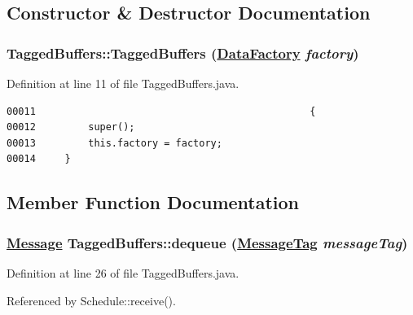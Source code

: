 \subsection{Constructor \& Destructor Documentation}
\hypertarget{classTaggedBuffers_a0}{
\subsubsection[TaggedBuffers]{\setlength{\rightskip}{0pt plus 5cm}Tagged\-Buffers::Tagged\-Buffers (\hyperlink{interfaceDataFactory}{Data\-Factory} {\em factory})}}
\label{classTaggedBuffers_a0}




Definition at line 11 of file Tagged\-Buffers.java.\footnotesize\begin{verbatim}00011                                               {
00012         super();
00013         this.factory = factory;
00014     }
\end{verbatim}\normalsize 


\subsection{Member Function Documentation}
\hypertarget{classTaggedBuffers_a2}{
\subsubsection[dequeue]{\setlength{\rightskip}{0pt plus 5cm}\hyperlink{interfaceMessage}{Message} Tagged\-Buffers::dequeue (\hyperlink{interfaceMessageTag}{Message\-Tag} {\em message\-Tag})}}
\label{classTaggedBuffers_a2}




Definition at line 26 of file Tagged\-Buffers.java.

Referenced by Schedule::receive().

